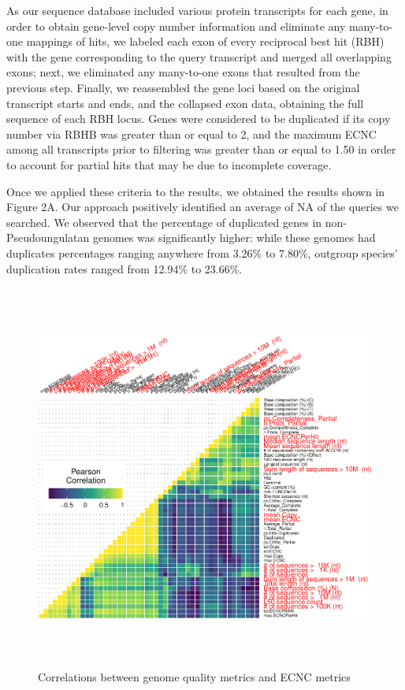 \documentclass[]{elsarticle} %
\begin{document}
As our sequence database included various protein transcripts for each
gene, in order to obtain gene-level copy number information and
eliminate any many-to-one mappings of hits, we labeled each exon of
every reciprocal best hit (RBH) with the gene corresponding to the query
transcript and merged all overlapping exons; next, we eliminated any
many-to-one exons that resulted from the previous step. Finally, we
reassembled the gene loci based on the original transcript starts and
ends, and the collapsed exon data, obtaining the full sequence of each
RBH locus. Genes were considered to be duplicated if its copy number via
RBHB was greater than or equal to 2, and the maximum ECNC among all
transcripts prior to filtering was greater than or equal to 1.50 in
order to account for partial hits that may be due to incomplete
coverage.

Once we applied these criteria to the results, we obtained the results
shown in Figure 2A. Our approach positively identified an average of NA
of the queries we searched. We observed that the percentage of
duplicated genes in non-Pseudoungulatan genomes was significantly
higher: while these genomes had duplicates percentages ranging anywhere
from 3.26\% to 7.80\%, outgroup species' duplication rates ranged from
12.94\% to 23.66\%.

\begin{figure}

{\centering \includegraphics[width=5in,height=5in]{paper_PLOS_draft_files/figure-latex/Figure4-1} 

}

\caption{Correlations between genome quality metrics and ECNC metrics}\label{fig:Figure4}
\end{figure}
\end{document}
